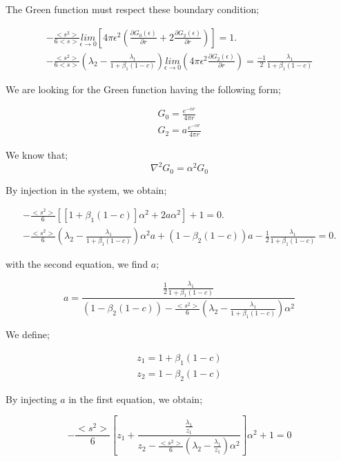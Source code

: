 \documentclass[a4paper, 12pt]{report}
\newcommand{\bl}{\big<}
\newcommand{\bg}{\big>}
\begin{document}
The Green function must respect these boundary condition;

\begin{align}
-\frac{\bl s^2 \bg}{6\bl s \bg} \underset{\epsilon \rightarrow 0}{lim} \left[4\pi \epsilon^2\left(\frac{\partial G_0(\epsilon)}{\partial r} + 2\frac{\partial G_2(\epsilon)}{\partial r} \right)\right]=1.\\
-\frac{\bl s^2 \bg}{6\bl s \bg}\left(\lambda_2 - \frac{\lambda_1}{1+\beta_1(1-c)}\right) \underset{\epsilon \rightarrow 0}{lim} \left(4\pi \epsilon^2 \frac{\partial G_2(\epsilon)}{\partial r}\right) = \frac{-1}{2}\frac{\lambda_1}{1+\beta_1(1-c)}
\end{align}

We are looking for the Green function having the following form;

\begin{align}
G_0 = \frac{e^{-\alpha r}}{4\pi r}\\
G_2 = a\frac{e^{-\alpha r}}{4\pi r}
\end{align}

We know that;
\begin{equation}
\nabla^2 G_0 = \alpha^2 G_0
\end{equation}

By injection in the system, we obtain;

\begin{align}
-\frac{\bl s^2 \bg}{6} \left[\left[1+\beta_1(1-c)\right]\alpha^2+ 2a\alpha^2\right] + 1 = 0. \\
-\frac{\bl s^2 \bg}{6}\left(\lambda_2 - \frac{\lambda_1}{1+\beta_1(1-c)}\right)\alpha^2a+ (1-\beta_2(1-c))a - \frac{1}{2} \frac{\lambda_1}{1+\beta_1(1-c)} = 0.
\end{align}

with the second equation, we find $a$;

\begin{equation}
a = \frac{\frac{1}{2}\frac{\lambda_1}{1+\beta_1(1-c)}}{(1-\beta_2(1-c)) - \frac{\bl s^2 \bg}{6} \left(\lambda_2 - \frac{\lambda_1}{1+\beta_1(1-c)}\right)\alpha^2 } 
\end{equation}

We define;

\begin{align}
z_1 = 1+\beta_1(1-c)\\
z_2 = 1- \beta_2(1-c)
\end{align}

By injecting $a$ in the first equation, we obtain;

\begin{equation}
-\frac{\bl s^2 \bg}{6} \left[z_1+\frac{\frac{\lambda_1}{z_1}}{{z_2 - \frac{\bl s^2 \bg}{6} \left(\lambda_2 - \frac{\lambda_1}{z_1}\right)\alpha^2 }}  \right]\alpha^2 + 1 = 0
\end{equation}
\end{document}
